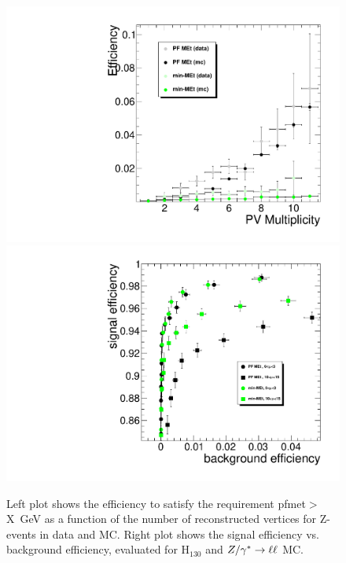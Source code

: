  
\begin{figure}[hbt]
\begin{center}
\includegraphics[width=0.45\linewidth]{figures/pfmet_minmet_Eff30.pdf} 
\includegraphics[width=0.45\linewidth]{figures/SignalVsBkgrEfficiency.pdf} 
\caption{\label{fig:met_eff}\protect Left plot shows the efficiency to satisfy
 the requirement pfmet$>$X~GeV as a function of the number of reconstructed 
vertices for Z-events in data and MC. Right plot shows the signal efficiency 
vs. background efficiency, evaluated for H$_{130}$ and $Z/\gamma^*\to\ell\ell$ MC.}
\end{center}
\end{figure}
